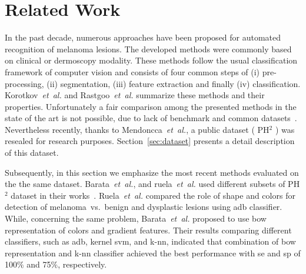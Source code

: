 \section{Related Work}
\label{sec:rw}
In the past decade, numerous approaches have been proposed for automated recognition of melanoma lesions.
The developed methods were commonly based on clinical or dermoscopy modality.
These methods follow the usual classification framework of computer vision and consists of four common steps of (i) pre-processing, (ii) segmentation, (iii) feature extraction and finally (iv) classification.
Korotkov~\emph{et~al.}\cite{korotkov2012computerized} and Rastgoo~\emph{et~al.}\cite{rastgoo2015automatic} summarize these methods and their properties.
Unfortunately a fair comparison among the presented methods in the state of the art is not possible, due to lack of benchmark and common datasets~\cite{rastgoo2015automatic,korotkov2012computerized}.
Nevertheless recently, thanks to Mendoncca~\emph{et~al.}\cite{mendoncca2013ph}, a public dataset ( PH$^{2}$ ) was resealed for research purposes.
Section~\ref{sec:dataset} presents a detail description of this dataset.

Subsequently, in this section we emphasize the most recent methods evaluated on the the same dataset.
Barata~\emph{et~al.}\cite{barata2013two,barata2013role}, and ruela~\emph{et~al.}\cite{ruela2013role,ruela2013color} used different subsets of PH$^{2}$ dataset in their works~\cite{mendoncca2013ph}.
Ruela~\emph{et~al.}\cite{ruela2013role,ruela2013color} compared the role of shape and colors for detection of melanoma~vs.~benign and dysplastic lesions using \ac{adb} classifier.
While, concerning the same problem, Barata~\emph{et~al.}\cite{barata2013two,barata2013towards} proposed to use \ac{bow} representation of colors and gradient features.
Their results comparing different classifiers, such as \ac{adb}, kernel \ac{svm}, and k-\ac{nn}, indicated that combination of \ac{bow} representation and k-\ac{nn} classifier achieved the best performance with \ac{se} and \ac{sp} of 100$\%$ and 75$\%$, respectively.